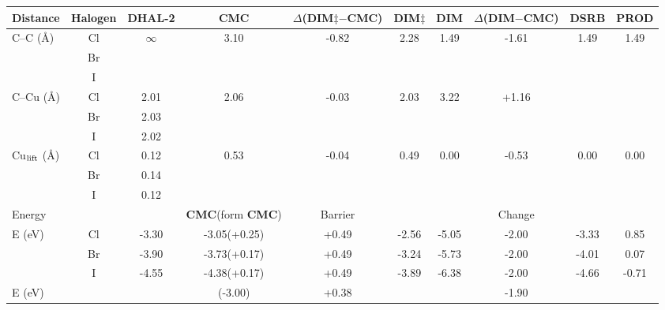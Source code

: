 \documentclass[%
 reprint,
 amsmath,amssymb,
 aps,
prb,
floatfix,
]{revtex4-2}
\begin{document}

\begin{table}
\centering
\begin{tabular}{ lccccccccc  }
 \hline
 \hline
 Distance & Halogen & \textbf{DHAL-2} & \textbf{CMC} & $\Delta$(\textbf{DIM$\ddagger$}$-$\textbf{CMC}) & \textbf{DIM$\ddagger$} & \textbf{DIM} & $\Delta$(\textbf{DIM}$-$\textbf{CMC}) & \textbf{DSRB} & \textbf{PROD}\\ 
 \hline 
 \multirow{3}{*}{C--C (\si{\angstrom})} & Cl & \multirow{3}{*}{$\infty$} & \multirow{3}{*}{3.10} & \multirow{3}{*}{-0.82} & \multirow{3}{*}{2.28} & \multirow{3}{*}{1.49} & \multirow{3}{*}{-1.61} & \multirow{3}{*}{1.49} &\multirow{3}{*}{1.49}\\ 
 & Br & &  &  &  & & & &\\ 
 & I & &  &  &  & & & &\\ 
 \hline
 \multirow{3}{*}{C--Cu (\si{\angstrom}) } & Cl & 2.01 & \multirow{3}{*}{2.06} & \multirow{3}{*}{-0.03} & \multirow{3}{*}{2.03} & \multirow{3}{*}{3.22} & \multirow{3}{*}{+1.16} & \multirow{3}{*}{} &\multirow{3}{*}{}\\ 
 & Br & 2.03 &  &  &  & & & &\\ 
 & I &2.02 &  &  &  & & & &\\ 
 \hline
 \multirow{3}{*}{Cu$_{\rm lift}$ (\si{\angstrom}) } & Cl & 0.12 & \multirow{3}{*}{0.53} & \multirow{3}{*}{-0.04} & \multirow{3}{*}{0.49} & \multirow{3}{*}{0.00} & \multirow{3}{*}{-0.53} & \multirow{3}{*}{0.00} &\multirow{3}{*}{0.00}\\ 
 & Br & 0.14 &  &  &  & & & &\\ 
 & I &0.12 &  &  &  & & & &\\ 
 \hline
 \hline
 Energy & & & \textbf{CMC}(form \textbf{CMC}) & Barrier & & & Change & &\\
 \hline
 \multirow{3}{*}{E (\si{\electronvolt}) } & Cl & -3.30 & -3.05(+0.25) &+0.49 &-2.56 & -5.05 & -2.00& -3.33&0.85\\ 
 & Br &-3.90 & -3.73(+0.17) &+0.49 & -3.24& -5.73 & -2.00& -4.01&0.07\\ 
 & I  & -4.55 & -4.38(+0.17) & +0.49& -3.89& -6.38 & -2.00& -4.66&-0.71\\ 
 \hline
 E (\si{\electronvolt})~\cite{pccp2010} & & & (-3.00) & +0.38 & & & -1.90 & & \\

\end{tabular}
\end{table}
\end{document}
